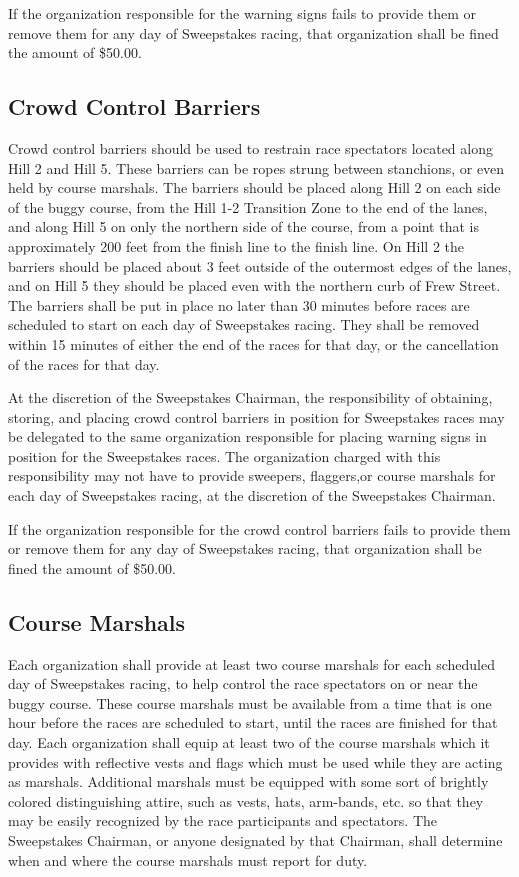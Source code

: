 \documentclass[openany]{book}
\begin{document}
If the organization responsible for the warning signs fails to provide them or remove them for any day of Sweepstakes racing, that organization shall be fined the amount of \$50.00.

\subsection{Crowd Control Barriers}

Crowd control barriers should be used to restrain race spectators located along Hill 2 and Hill 5. These barriers can be ropes strung between stanchions, or even held by course marshals. The barriers should be placed along Hill 2 on each side of the buggy course, from the Hill 1-2 Transition Zone to the end of the lanes, and along Hill 5 on only the northern side of the course, from a point that is approximately 200 feet from the finish line to the finish line. On Hill 2 the barriers should be placed about 3 feet outside of the outermost edges of the lanes, and on Hill 5 they should be placed even with the northern curb of Frew Street. The barriers shall be put in place no later than 30 minutes before races are scheduled to start on each day of Sweepstakes racing. They shall be removed within 15 minutes of either the end of the races for that day, or the cancellation of the races for that day.

At the discretion of the Sweepstakes Chairman, the responsibility of obtaining, storing, and placing crowd control barriers in position for Sweepstakes races may be delegated to the same organization responsible for placing warning signs in position for the Sweepstakes races. The organization charged with this responsibility may not have to provide sweepers, flaggers,or course marshals for each day of Sweepstakes racing, at the discretion of the Sweepstakes Chairman.

If the organization responsible for the crowd control barriers fails to provide them or remove them for any day of Sweepstakes racing, that organization shall be fined the amount of \$50.00.

\subsection{Course Marshals}

Each organization shall provide at least two course marshals for each scheduled day of Sweepstakes racing, to help control the race spectators on or near the buggy course. These course marshals must be available from a time that is one hour before the races are scheduled to start, until the races are finished for that day. Each organization shall equip at least two of the course marshals which it provides with reflective vests and flags which must be used while they are acting as marshals. Additional marshals must be equipped with some sort of brightly colored distinguishing attire, such as vests, hats, arm-bands, etc. so that they may be easily recognized by the race participants and spectators. The Sweepstakes Chairman, or anyone designated by that Chairman, shall determine when and where the course marshals must report for duty.
\end{document}
